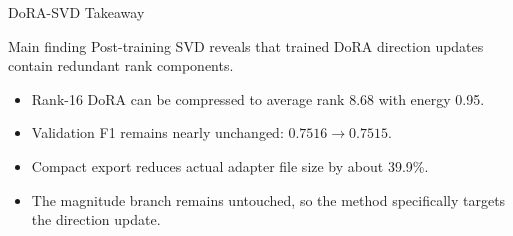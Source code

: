\begin{frame}{DoRA-SVD Takeaway}
\begin{block}{Main finding}
Post-training SVD reveals that trained DoRA direction updates contain redundant rank components.
\end{block}

\vspace{6pt}
\begin{itemize}
  \item Rank-16 DoRA can be compressed to average rank 8.68 with energy 0.95.
  \item Validation F1 remains nearly unchanged: \(0.7516 \rightarrow 0.7515\).
  \item Compact export reduces actual adapter file size by about 39.9\%.
  \item The magnitude branch remains untouched, so the method specifically targets the direction update.
\end{itemize}
\end{frame}

